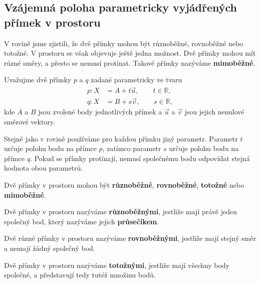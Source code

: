 \subsection{Vzájemná poloha parametricky vyjádřených přímek v prostoru}
\label{subsec:Relative_position_parametric_lines_space}

V rovině jsme zjistili, že dvě přímky mohou být různoběžné,
rovnoběžné nebo totožné. V prostoru se však objevuje ještě jedna
možnost. Dvě přímky mohou mít různé směry, a přesto se nemusí
protínat. Takové přímky nazýváme \textbf{mimoběžné}.

Uvažujme dvě přímky $p$ a $q$ zadané parametricky ve tvaru
\begin{align}
    p: X &= A+t\vec{u},
    \qquad t\in\mathbb{R},
    \label{eq:Parametric_line_p_relative_position_space}\\
    q: X &= B+s\vec{v},
    \qquad s\in\mathbb{R},
    \label{eq:Parametric_line_q_relative_position_space}
\end{align}
kde $A$ a $B$ jsou zvolené body jednotlivých přímek a
$\vec{u}$ a $\vec{v}$ jsou jejich nenulové směrové vektory.

Stejně jako v rovině používáme pro každou přímku jiný parametr.
Parametr $t$ určuje polohu bodu na přímce $p$, zatímco parametr $s$
určuje polohu bodu na přímce $q$. Pokud se přímky protínají, nemusí
společnému bodu odpovídat stejná hodnota obou parametrů.

Dvě přímky v prostoru mohou být \textbf{různoběžné},
\textbf{rovnoběžné}, \textbf{totožné} nebo \textbf{mimoběžné}.

\begin{definition}
    \label{def:Intersecting_lines_space}
    Dvě přímky v prostoru nazýváme \textbf{různoběžnými}, jestliže
    mají právě jeden společný bod, který nazýváme jejich
    \textbf{průsečíkem}.
\end{definition}

\begin{definition}
    \label{def:Parallel_lines_space}
    Dvě různé přímky v prostoru nazýváme \textbf{rovnoběžnými},
    jestliže mají stejný směr a nemají žádný společný bod.
\end{definition}

\begin{definition}
    \label{def:Coincident_lines_space}
    Dvě přímky v prostoru nazýváme \textbf{totožnými}, jestliže
    mají všechny body společné, a představují tedy tutéž množinu bodů.
\end{definition}

